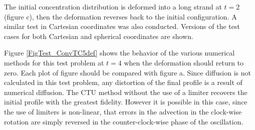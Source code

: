 The initial concentration distribution is deformed into a long strand at $t=2$ (figure c),
then the deformation reverses back to the initial configuration.  A similar test in
Cartesian coordinates %
was also conducted.  Versions of the
test cases for both Cartesian and spherical coordinates are shown.

Figure \ref{FigTest_ConvTC5def} shows the behavior of the various numerical
methods for this test problem at $t=4$
when the deformation should return to zero.  Each plot of figure should be compared with
figure a.  Since diffusion is not calculated in this test problem, any distortion of the
final profile is a result of numerical diffusion.  The CTU method without the use of a
limiter recovers the initial profile with the greatest fidelity.  However it is possible
in this case, since the use of limiters is non-linear, that errors in the advection in
the clock-wise rotation are simply reversed in the counter-clock-wise phase of the oscillation.

